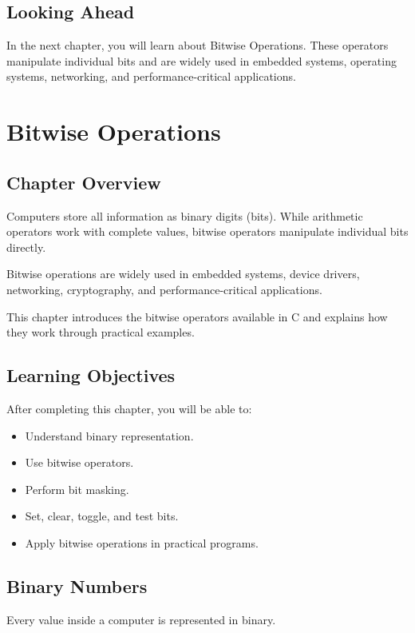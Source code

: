 \documentclass[12pt,openany]{book}
\begin{document}
\section{Looking Ahead}

In the next chapter, you will learn about Bitwise Operations. These operators manipulate individual bits and are widely used in embedded systems, operating systems, networking, and performance-critical applications.
\chapter{Bitwise Operations}

\section{Chapter Overview}

Computers store all information as binary digits (bits). While arithmetic operators work with complete values, bitwise operators manipulate individual bits directly.

Bitwise operations are widely used in embedded systems, device drivers, networking, cryptography, and performance-critical applications.

This chapter introduces the bitwise operators available in C and explains how they work through practical examples.

\section{Learning Objectives}

After completing this chapter, you will be able to:

\begin{itemize}
    \item Understand binary representation.
    \item Use bitwise operators.
    \item Perform bit masking.
    \item Set, clear, toggle, and test bits.
    \item Apply bitwise operations in practical programs.
\end{itemize}

\section{Binary Numbers}

Every value inside a computer is represented in binary.
\end{document}
